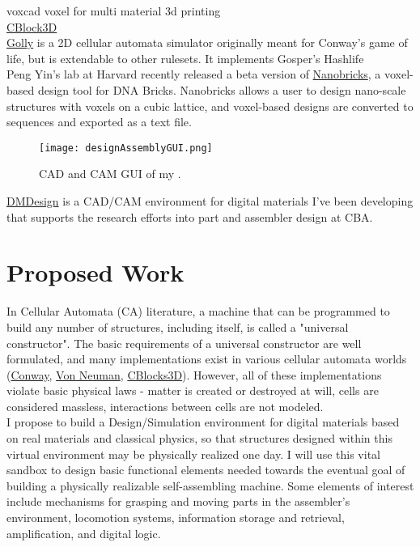 {voxcad\cite{Hiller2014a}
voxel for multi material 3d printing
\\

\href{https://www.youtube.com/watch?feature=player_embedded&v=PBXO_6Jn1fs}{CBlock3D}
\\

\href{http://golly.sourceforge.net/}{Golly} is a 2D cellular automata simulator originally meant for Conway's game of life, but is extendable to other rulesets.  It implements Gosper's Hashlife 
\\

Peng Yin's lab at Harvard recently released a beta version of \href{http://yin.hms.harvard.edu/bricks/try/}{Nanobricks}, a voxel-based design tool for DNA Bricks.  Nanobricks allows a user to design nano-scale structures with voxels on a cubic lattice, and voxel-based designs are converted to sequences and exported as a text file.
\\

\begin{figure}
  \texttt{[image: designAssemblyGUI.png]}
  \caption{CAD and CAM GUI of my .}
  \label{fig: designAssemblyGUI}
\end{figure}
\href{http://dma.cba.mit.edu/dmdesign/}{DMDesign} is a CAD/CAM environment for digital materials I've been developing that supports the research efforts into part  and assembler design at CBA.  



\section{Proposed Work}

In Cellular Automata (CA) literature, a machine that can be programmed to build any number of structures, including itself, is called a "universal constructor".  The basic requirements of a universal constructor are well formulated\cite{Neumann1966}, and many implementations exist in various cellular automata worlds (\href{https://www.youtube.com/watch?v=A8B5MbHPlH0}{Conway}, \href{https://en.wikipedia.org/wiki/Von_Neumann_universal_constructor#/media/File:Nobili_Pesavento_2reps.png}{Von Neuman}, \href{https://www.youtube.com/watch?v=PBXO_6Jn1fs}{CBlocks3D}).  However, all of these implementations violate basic physical laws - matter is created or destroyed at will, cells are considered massless, interactions between cells are not modeled.
\\

I propose to build a Design/Simulation environment for digital materials based on real materials and classical physics, so that structures designed within this virtual environment may be physically realized one day.  I will use this vital sandbox to design basic functional elements needed towards the eventual goal of building a physically realizable self-assembling machine.  Some elements of interest include mechanisms for grasping and moving parts in the assembler's environment, locomotion systems, information storage and retrieval, amplification, and digital logic.

}
